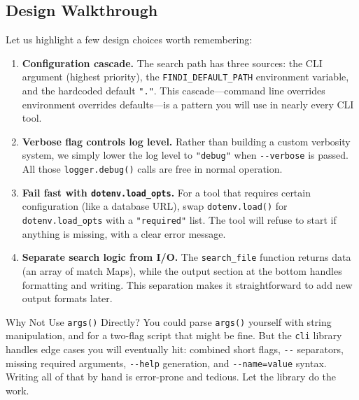 \subsection{Design Walkthrough}\label{sec:cli-design-walkthrough}

Let us highlight a few design choices worth remembering:

\begin{enumerate}
  \item \textbf{Configuration cascade.} The search path has three sources: the CLI argument (highest priority), the \lstinline|FINDI_DEFAULT_PATH| environment variable, and the hardcoded default \lstinline|"."|.
  This cascade---command line overrides environment overrides defaults---is a pattern you will use in nearly every CLI tool.

  \item \textbf{Verbose flag controls log level.} Rather than building a custom verbosity system, we simply lower the log level to \lstinline|"debug"| when \lstinline|--verbose| is passed.
  All those \lstinline|logger.debug()| calls are free in normal operation.

  \item \textbf{Fail fast with \lstinline|dotenv.load_opts|.} For a tool that requires certain configuration (like a database URL), swap \lstinline|dotenv.load()| for \lstinline|dotenv.load_opts| with a \lstinline|"required"| list.
  The tool will refuse to start if anything is missing, with a clear error message.

  \item \textbf{Separate search logic from I/O.} The \lstinline|search_file| function returns data (an array of match Maps), while the output section at the bottom handles formatting and writing.
  This separation makes it straightforward to add new output formats later.
\end{enumerate}

\begin{notebox}{Why Not Use \texttt{args()} Directly?}
You could parse \lstinline|args()| yourself with string manipulation, and for a two-flag script that might be fine.
But the \lstinline|cli| library handles edge cases you will eventually hit: combined short flags, \texttt{-{}-} separators, missing required arguments, \texttt{-{}-help} generation, and \texttt{-{}-name=value} syntax.
Writing all of that by hand is error-prone and tedious.
Let the library do the work.
\end{notebox}

